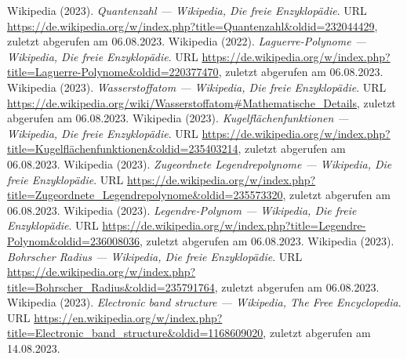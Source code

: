 \documentclass[../main.tex]{subfiles}
\begin{document}
\begin{thebibliography}{99}




		 Wikipedia (2023). \emph{Quantenzahl --- Wikipedia{,} Die freie Enzyklopädie}. URL \url{https://de.wikipedia.org/w/index.php?title=Quantenzahl&oldid=232044429}, zuletzt abgerufen am 06.08.2023. 
		 Wikipedia (2022). \emph{Laguerre-Polynome --- Wikipedia{,} Die freie Enzyklopädie}. URL \url{https://de.wikipedia.org/w/index.php?title=Laguerre-Polynome&oldid=220377470}, zuletzt abgerufen am 06.08.2023. 
		 Wikipedia (2023). \emph{Wasserstoffatom --- Wikipedia{,} Die freie Enzyklopädie}. URL \url{https://de.wikipedia.org/wiki/Wasserstoffatom#Mathematische_Details}, zuletzt abgerufen am 06.08.2023.
		 Wikipedia (2023). \emph{Kugelflächenfunktionen --- Wikipedia{,} Die freie Enzyklopädie}. URL \url{https://de.wikipedia.org/w/index.php?title=Kugelflächenfunktionen&oldid=235403214}, zuletzt abgerufen am 06.08.2023.
		 Wikipedia (2023). \emph{Zugeordnete Legendrepolynome --- Wikipedia{,} Die freie Enzyklopädie}. URL \url{https://de.wikipedia.org/w/index.php?title=Zugeordnete_Legendrepolynome&oldid=235573320}, zuletzt abgerufen am 06.08.2023.
		 Wikipedia (2023). \emph{Legendre-Polynom --- Wikipedia{,} Die freie Enzyklopädie}. URL \url{https://de.wikipedia.org/w/index.php?title=Legendre-Polynom&oldid=236008036}, zuletzt abgerufen am 06.08.2023.
		 Wikipedia (2023). \emph{Bohrscher Radius --- Wikipedia{,} Die freie Enzyklopädie}. URL \url{https://de.wikipedia.org/w/index.php?title=Bohrscher_Radius&oldid=235791764}, zuletzt abgerufen am 06.08.2023.
		 Wikipedia (2023). \emph{Electronic band structure --- Wikipedia{,} The Free Encyclopedia}. URL \url{https://en.wikipedia.org/w/index.php?title=Electronic_band_structure&oldid=1168609020}, zuletzt abgerufen am 14.08.2023.


\end{thebibliography}
\end{document}

